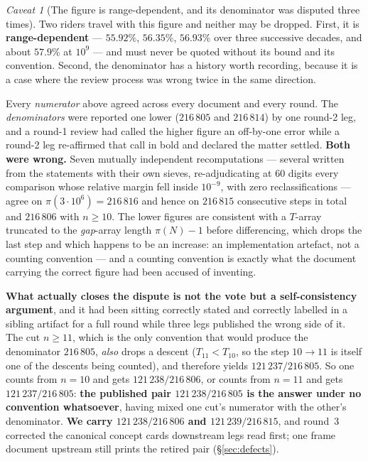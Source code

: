 \documentclass[11pt,a4paper]{article}
\theoremstyle{plain}
\theoremstyle{definition}
\theoremstyle{remark}
\newtheorem{hazard}[theorem]{Caveat}
\begin{document}
\begin{hazard}[The figure is range-dependent, and its denominator was disputed three times]
\label{haz:5592}
Two riders travel with this figure and neither may be dropped. First, it is
\textbf{range-dependent} --- $55.92\%$, $56.35\%$, $56.93\%$ over three successive decades, and
about $57.9\%$ at $10^9$ --- and must never be quoted without its bound and its convention.
Second, the denominator has a history worth recording, because it is a case where the review
process was wrong twice in the same direction.

Every \emph{numerator} above agreed across every document and every round. The
\emph{denominators} were reported one lower ($216\,805$ and $216\,814$) by one round-2 leg, and
a round-1 review had called the higher figure an off-by-one error while a round-2 leg
re-affirmed that call in bold and declared the matter settled. \textbf{Both were wrong.} Seven
mutually independent recomputations --- several written from the statements with their own
sieves, re-adjudicating at $60$ digits every comparison whose relative margin fell inside
$10^{-9}$, with zero reclassifications --- agree on $\pi(3\cdot10^6) = 216\,816$ and hence on
$216\,815$ consecutive steps in total and $216\,806$ with $n \ge 10$. The lower figures are
consistent with a $T$-array truncated to the \emph{gap}-array length $\pi(N)-1$ before
differencing, which drops the last step and which happens to be an increase: an implementation
artefact, not a counting convention --- and a counting convention is exactly what the document
carrying the correct figure had been accused of inventing.

\textbf{What actually closes the dispute is not the vote but a self-consistency argument}, and
it had been sitting correctly stated and correctly labelled in a sibling artifact for a full
round while three legs published the wrong side of it. The cut $n \ge 11$, which is the only
convention that would produce the denominator $216\,805$, \emph{also} drops a descent
($T_{11} < T_{10}$, so the step $10 \to 11$ is itself one of the descents being counted), and
therefore yields $121\,237/216\,805$. So one counts from $n = 10$ and gets
$121\,238/216\,806$, or counts from $n = 11$ and gets $121\,237/216\,805$: \textbf{the
published pair $121\,238/216\,805$ is the answer under no convention whatsoever}, having mixed
one cut's numerator with the other's denominator. \textbf{We carry $121\,238/216\,806$ and
$121\,239/216\,815$}, and round~3 corrected the canonical concept cards downstream legs read
first; one frame document upstream still prints the retired pair (\S\ref{sec:defects}).
\end{hazard}
\end{document}
